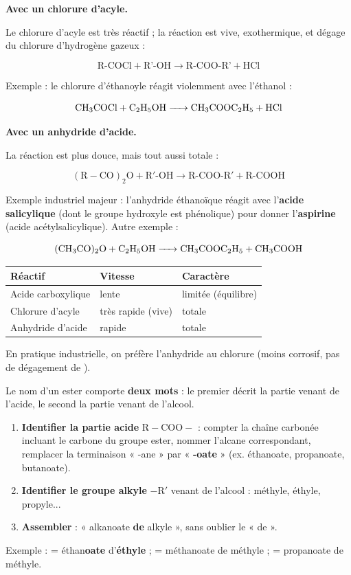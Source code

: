 \documentclass[11pt]{article}
\newcounter{popsec}
\newcounter{popsub}
\newcommand{\courssub}[1]{%
  \stepcounter{popsub}%
  \par\vspace{9pt}\noindent{\popxbold\fontsize{11.5}{13}\selectfont\color{popink}{\color{poporange}\thepopsec.\thepopsub}\hspace{6pt}#1}\par\nopagebreak\vspace{4pt}
}
\begin{document}
\textbf{Avec un chlorure d'acyle.}\par
Le chlorure d'acyle est très réactif ; la réaction est vive, exothermique, et dégage du chlorure d'hydrogène gazeux :

\[ \text{R-COCl} + \text{R'-OH} \rightarrow \text{R-COO-R'} + \text{HCl} \]

Exemple : le chlorure d'éthanoyle réagit violemment avec l'éthanol :

\[ \ce{CH3COCl + C2H5OH -> CH3COOC2H5 + HCl} \]

\textbf{Avec un anhydride d'acide.}\par
La réaction est plus douce, mais tout aussi totale :

\[ \mathrm{(R-CO)_2O + R'\text{-}OH \rightarrow R\text{-}COO\text{-}R' + R\text{-}COOH} \]

Exemple industriel majeur : l'anhydride éthanoïque réagit avec l'\textbf{acide salicylique} (dont le groupe hydroxyle est phénolique) pour donner l'\textbf{aspirine} (acide acétylsalicylique). Autre exemple :

\[ \ce{(CH3CO)2O + C2H5OH -> CH3COOC2H5 + CH3COOH} \]

\begin{aretenir}
\begin{center}
\begin{tabularx}{\linewidth}{|l|X|X|}
\hline
\rowcolor{popblueL}
Réactif & Vitesse & Caractère \\
\hline
Acide carboxylique & lente & limitée (équilibre) \\
\hline
Chlorure d'acyle & très rapide (vive) & totale \\
\hline
Anhydride d'acide & rapide & totale \\
\hline
\end{tabularx}
\end{center}
En pratique industrielle, on préfère l'anhydride au chlorure (moins corrosif, pas de dégagement de ).
\end{aretenir}

\courssub{Nomenclature des esters}

Le nom d'un ester comporte \textbf{deux mots} : le premier décrit la partie venant de l'acide, le second la partie venant de l'alcool.

\begin{methode}
\begin{enumerate}
\item \textbf{Identifier la partie acide} $\mathrm{R-COO}-$ : compter la chaîne carbonée incluant le carbone du groupe ester, nommer l'alcane correspondant, remplacer la terminaison « -ane » par « \textbf{-oate} » (ex. éthanoate, propanoate, butanoate).
\item \textbf{Identifier le groupe alkyle} $-\mathrm{R'}$ venant de l'alcool : méthyle, éthyle, propyle...
\item \textbf{Assembler} : « alkanoate \textbf{de} alkyle », sans oublier le « de ».
\end{enumerate}
Exemple :  = éthan\textbf{oate} d'\textbf{éthyle} ;  = méthanoate de méthyle ;  = propanoate de méthyle.
\end{methode}
\end{document}

